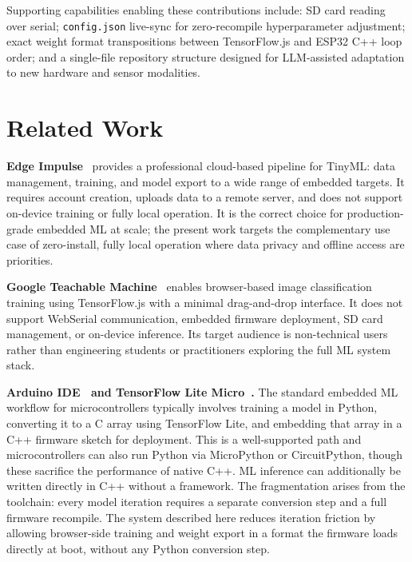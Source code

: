 \documentclass[11pt]{article}
\begin{document}
Supporting capabilities enabling these contributions include: SD card reading over serial; \texttt{config.json} live-sync for zero-recompile hyperparameter
adjustment; exact weight format transpositions between TensorFlow.js and ESP32 C++ loop
order; and a single-file repository structure designed for LLM-assisted adaptation to
new hardware and sensor modalities.

\section{Related Work}

\textbf{Edge Impulse}~\cite{edgeimpulse} provides a professional cloud-based pipeline
for TinyML: data management, training, and model export to a wide range of embedded
targets. It requires account creation, uploads data to a remote server, and does not
support on-device training or fully local operation. It is the correct choice for
production-grade embedded ML at scale; the present work targets the complementary use
case of zero-install, fully local operation where data privacy and offline access are
priorities.

\textbf{Google Teachable Machine}~\cite{teachablemachine} enables browser-based image
classification training using TensorFlow.js with a minimal drag-and-drop interface.
It does not support WebSerial communication, embedded firmware deployment, SD card
management, or on-device inference. Its target audience is non-technical users rather
than engineering students or practitioners exploring the full ML system stack.

\textbf{Arduino IDE~\cite{arduinoide} and TensorFlow Lite Micro~\cite{tflitemicro}.} The standard embedded ML workflow for microcontrollers typically involves training a model in Python, converting it to a C array using TensorFlow Lite, and embedding that array in a C++ firmware sketch for deployment. This is a well-supported path and microcontrollers can also run Python via MicroPython or CircuitPython, though these sacrifice the performance of native C++. ML inference can additionally be written directly in C++ without a framework. The fragmentation arises from the toolchain: every model iteration requires a separate conversion step and a full firmware recompile. The system described here reduces iteration friction by allowing browser-side training and weight export in a format the firmware loads directly at boot, without any Python conversion step.
\end{document}

